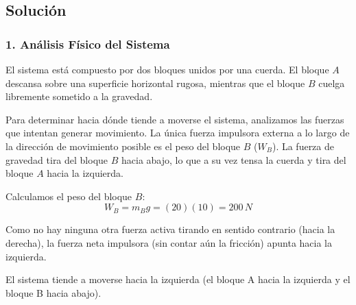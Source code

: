 \documentclass[12pt, a4paper]{article}
\begin{document}
\begin{center}
\end{center}

\subsection*{Solución}

\subsubsection*{1. Análisis Físico del Sistema}
El sistema está compuesto por dos bloques unidos por una cuerda. El bloque $A$ descansa sobre una superficie horizontal rugosa, mientras que el bloque $B$ cuelga libremente sometido a la gravedad. 

Para determinar hacia dónde tiende a moverse el sistema, analizamos las fuerzas que intentan generar movimiento. La única fuerza impulsora externa a lo largo de la dirección de movimiento posible es el peso del bloque $B$ ($W_B$). La fuerza de gravedad tira del bloque $B$ hacia abajo, lo que a su vez tensa la cuerda y tira del bloque $A$ hacia la izquierda.

Calculamos el peso del bloque $B$:
$$ W_B = m_B g = (20)(10) = 200\,\si{N} $$

Como no hay ninguna otra fuerza activa tirando en sentido contrario (hacia la derecha), la fuerza neta impulsora (sin contar aún la fricción) apunta hacia la izquierda.

\begin{tcolorbox}[colback=green!5!white, colframe=green!50!black, title=Respuesta Final]
\centering
El sistema tiende a moverse hacia la izquierda (el bloque A hacia la izquierda y el bloque B hacia abajo).
\end{tcolorbox}
\end{document}
